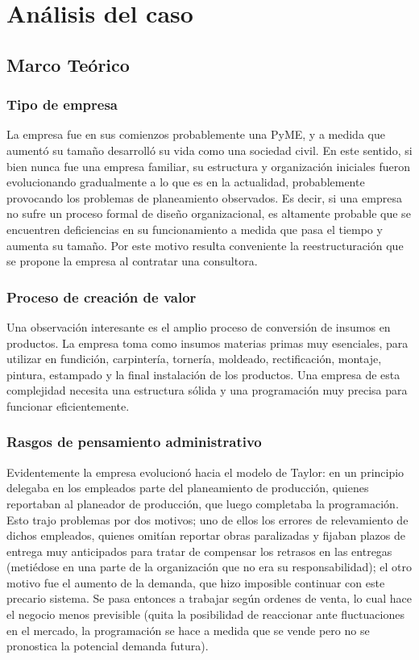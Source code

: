 \newpage
\section{An\'{a}lisis del caso}

\subsection{Marco Te\'orico}

\subsubsection{Tipo de empresa}
La empresa fue en sus comienzos probablemente una PyME, y a medida que aument\'o su tama\~no desarroll\'o su vida como una sociedad civil. En este sentido, si bien nunca fue una empresa familiar, su estructura y organizaci\'on iniciales fueron evolucionando gradualmente a lo que es en la actualidad, probablemente provocando los problemas de planeamiento observados. Es decir, si una empresa no sufre un proceso formal de dise\~no organizacional, es altamente probable que se encuentren deficiencias en su funcionamiento a medida que pasa el tiempo y aumenta su tama\~no. Por este motivo resulta conveniente la reestructuraci\'on que se propone la empresa al contratar una consultora.

\subsubsection{Proceso de creaci\'on de valor}
Una observaci\'on interesante es el amplio proceso de conversi\'on de insumos en productos. La empresa toma como insumos materias primas muy esenciales, para utilizar en fundici\'on, carpinter\'ia, torner\'ia, moldeado, rectificaci\'on, montaje, pintura, estampado y la final instalaci\'on de los productos. Una empresa de esta complejidad necesita una estructura s\'olida y una programaci\'on muy precisa para funcionar eficientemente.

\subsubsection{Rasgos de pensamiento administrativo}
Evidentemente la empresa evolucion\'o hacia el modelo de Taylor: en un principio delegaba en los empleados parte del planeamiento de producci\'on, quienes reportaban al planeador de producci\'on, que luego completaba la programaci\'on. Esto trajo problemas por dos motivos; uno de ellos los errores de relevamiento de dichos empleados, quienes omit\'ian reportar obras paralizadas y fijaban plazos de entrega muy anticipados para tratar de compensar los retrasos en las entregas (meti\'edose en una parte de la organizaci\'on que no era su responsabilidad); el otro motivo fue el aumento de la demanda, que hizo imposible continuar con este precario sistema. Se pasa entonces a trabajar seg\'{u}n ordenes de venta, lo cual hace el negocio menos previsible (quita la posibilidad de reaccionar ante fluctuaciones en el mercado, la programaci\'on se hace a medida que se vende pero no se pronostica la potencial demanda futura).

